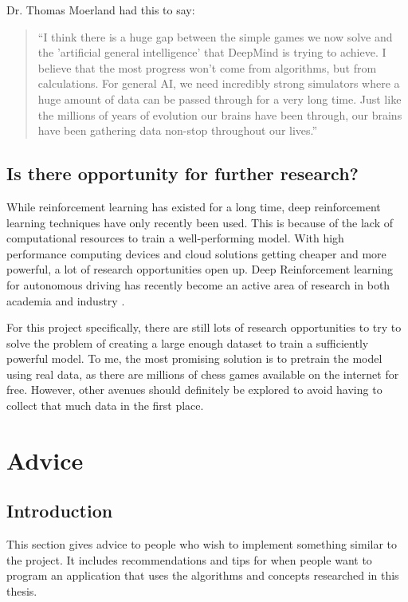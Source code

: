 \documentclass{article}
\begin{document}
Dr. Thomas Moerland had this to say:

\begin{quotation}
    ``I think there is a huge gap between the simple games we now solve and the 
    'artificial general intelligence' that DeepMind is trying to achieve.
    I believe that the most progress won't come from algorithms, but from calculations.
    For general AI, we need incredibly strong simulators where a huge amount of data
    can be passed through for a very long time. 
    Just like the millions of years of evolution our brains have been through, our brains
    have been gathering data non-stop throughout our lives.'' \cite{moerlandEmailExchangeTuur22}
\end{quotation}


\subsection{Is there opportunity for further research?}

While reinforcement learning has existed for a long time, deep reinforcement learning techniques 
have only recently been used. This is because of the lack of computational resources to train
a well-performing model. With high performance computing devices and cloud solutions getting cheaper
and more powerful, a lot of research opportunities open up.
Deep Reinforcement learning for autonomous driving has recently become an active area of research 
in both academia and industry \cite{DeepReinforcementLearning2022a}.

For this project specifically, there are still lots of research opportunities to try to solve the problem
of creating a large enough dataset to train a sufficiently powerful model. To me, the most promising solution is to
pretrain the model using real data, as there are millions of chess games available on the internet for free.
However, other avenues should definitely be explored to avoid having to collect that much data in the first place.

\newpage
\section{Advice}

\subsection{Introduction}

This section gives advice to people who wish to implement something similar to the project.
It includes recommendations and tips for when people want to program an application that uses
the algorithms and concepts researched in this thesis.
\end{document}
